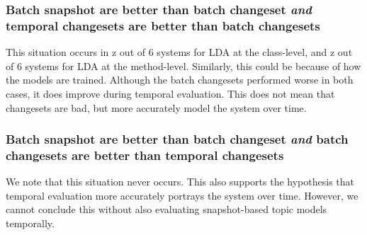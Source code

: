 \subsubsection{Batch snapshot are better than batch changeset
\emph{and} temporal changesets are better than batch changesets}


This situation occurs in
z out of 6 systems for LDA at the class-level, and
z out of 6 systems for LDA at the method-level.
Similarly, this could be because of how the models are trained.
Although the batch changesets performed worse in both cases, it does
improve during temporal evaluation.
This does not mean that changesets are bad, but more accurately model
the system over time.

\subsubsection{Batch snapshot are better than batch changeset
\emph{and} batch changesets are better than temporal changesets}

%
We note that this situation never occurs.
This also supports the hypothesis that temporal evaluation more accurately portrays the system over time.
However, we cannot conclude this without also evaluating snapshot-based topic models temporally.
